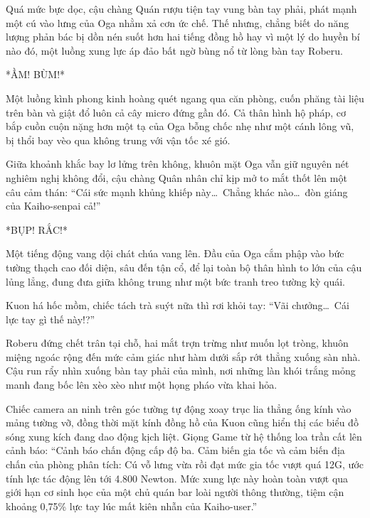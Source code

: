 \documentclass[../main.tex]{subfiles}
\begin{document}
Quá mức bực dọc, cậu chàng Quán rượu tiện tay vung bàn tay phải, phát mạnh một cú vào lưng của Oga nhằm xả cơn ức chế. Thế nhưng, chẳng biết do năng lượng phản bác bị dồn nén suốt hơn hai tiếng đồng hồ hay vì một lý do huyền bí nào đó, một luồng xung lực áp đảo bất ngờ bùng nổ từ lòng bàn tay Roberu.

*ẦM! BÙM!*

Một luồng kình phong kinh hoàng quét ngang qua căn phòng, cuốn phăng tài liệu trên bàn và giật đổ luôn cả cây micro đứng gần đó. Cả thân hình hộ pháp, cơ bắp cuồn cuộn nặng hơn một tạ của Oga bỗng chốc nhẹ như một cánh lông vũ, bị thổi bay vèo qua không trung với vận tốc xé gió.


Giữa khoảnh khắc bay lơ lửng trên không, khuôn mặt Oga vẫn giữ nguyên nét nghiêm nghị không đổi, cậu chàng Quân nhân chỉ kịp mở to mắt thốt lên một câu cảm thán: ``Cái sức mạnh khủng khiếp này\dots\ Chẳng khác nào\dots\ đòn giáng của Kaiho-senpai cả!''

*BỤP! RẮC!*

Một tiếng động vang dội chát chúa vang lên. Đầu của Oga cắm phập vào bức tường thạch cao đối diện, sâu đến tận cổ, để lại toàn bộ thân hình to lớn của cậu lủng lẳng, đung đưa giữa không trung như một bức tranh treo tường kỳ quái.


Kuon há hốc mồm, chiếc tách trà suýt nữa thì rơi khỏi tay: ``Vãi chưởng\dots\ Cái lực tay gì thế này!?''

Roberu đứng chết trân tại chỗ, hai mắt trợn trừng như muốn lọt tròng, khuôn miệng ngoác rộng đến mức cảm giác như hàm dưới sắp rớt thẳng xuống sàn nhà. Cậu run rẩy nhìn xuống bàn tay phải của mình, nơi những làn khói trắng mỏng manh đang bốc lên xèo xèo như một họng pháo vừa khai hỏa.


Chiếc camera an ninh trên góc tường tự động xoay trục lia thẳng ống kính vào mảng tường vỡ, đồng thời mặt kính đồng hồ của Kuon cũng hiển thị các biểu đồ sóng xung kích đang dao động kịch liệt. Giọng Game từ hệ thống loa trần cất lên cảnh báo: ``Cảnh báo chấn động cấp độ ba. Cảm biến gia tốc và cảm biến địa chấn của phòng phân tích: Cú vỗ lưng vừa rồi đạt mức gia tốc vượt quá 12G, ước tính lực tác động lên tới 4.800 Newton. Mức xung lực này hoàn toàn vượt qua giới hạn cơ sinh học của một chủ quán bar loài người thông thường, tiệm cận khoảng 0,75\% lực tay lúc mất kiên nhẫn của Kaiho-user.''
\end{document}
